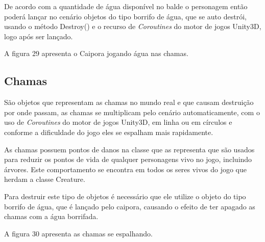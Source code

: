 De acordo com a quantidade de água disponível no balde o personagem então poderá lançar no cenário objetos do tipo borrifo de água, que se auto destrói, usando o método Destroy() e o recurso de \textit{Coroutines} do motor de jogos Unity3D, logo após ser lançado.

A figura 29 apresenta o Caipora jogando água nas chamas.

\begin{figure}[h!]
		\centering
	\end{figure}
	
	
	
\subsection{Chamas}
São objetos que representam as chamas no mundo real e que causam destruição por onde passam, as chamas se multiplicam pelo cenário automaticamente, com o uso de \textit{Coroutines} do motor de jogos Unity3D,  em linha ou em círculos e conforme a dificuldade do jogo eles se espalham mais rapidamente. 

As chamas possuem pontos de danos na classe que as representa que são usados para reduzir os pontos de vida de qualquer personagens vivo no jogo, incluindo árvores. Este comportamento se encontra em todos os seres vivos do jogo que herdam a classe Creature. 

Para destruir este tipo de objetos é necessário que ele utilize o objeto do tipo borrifo de água, que é lançado pelo caipora, causando o efeito de ter apagado as chamas com a água borrifada.

A figura 30 apresenta as chamas se espalhando.

\begin{figure}[h!]
		\centering
	\end{figure}
	
